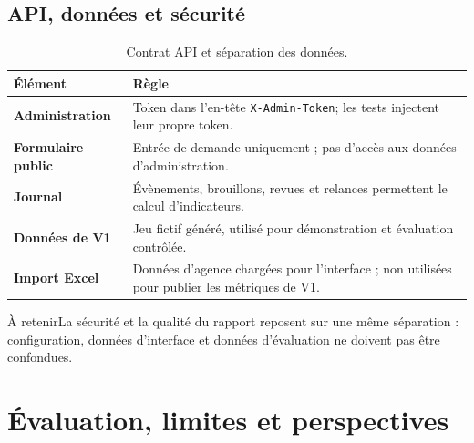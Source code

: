 \documentclass[11pt,a4paper,openany]{report}
\newcommand{\takeaway}[1]{\begin{keybox}{À retenir}#1\end{keybox}}
\begin{document}
\section{API, données et sécurité}
\begin{table}[H]\centering\small\caption{Contrat API et séparation des données.}\begin{tabularx}{\linewidth}{>{\bfseries}p{.28\linewidth}X}\toprule
Élément & Règle\\\midrule
Administration & Token dans l'en-tête \texttt{X-Admin-Token}; les tests injectent leur propre token.\\
Formulaire public & Entrée de demande uniquement ; pas d'accès aux données d'administration.\\
Journal & Évènements, brouillons, revues et relances permettent le calcul d'indicateurs.\\
Données de V1 & Jeu fictif généré, utilisé pour démonstration et évaluation contrôlée.\\
Import Excel & Données d'agence chargées pour l'interface ; non utilisées pour publier les métriques de V1.\\\bottomrule
\end{tabularx}\end{table}
\takeaway{La sécurité et la qualité du rapport reposent sur une même séparation : configuration, données d'interface et données d'évaluation ne doivent pas être confondues.}
\clearpage

\chapter{Évaluation, limites et perspectives}
\end{document}
